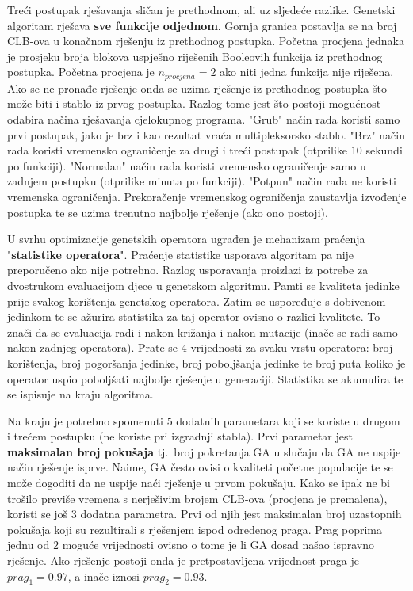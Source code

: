 \documentclass[times, utf8, diplomski]{fer}
\begin{document}
Treći postupak rješavanja sličan je prethodnom, ali uz sljedeće razlike. Genetski algoritam rješava \textbf{sve funkcije odjednom}. Gornja granica postavlja se na broj CLB-ova u konačnom rješenju iz prethodnog postupka. Početna procjena jednaka je prosjeku broja blokova uspješno riješenih Booleovih funkcija iz prethodnog postupka. Početna procjena je $n_{procjena}=2$ ako niti jedna funkcija nije riješena. Ako se ne pronađe rješenje onda se uzima rješenje iz prethodnog postupka što može biti i stablo iz prvog postupka. Razlog tome jest što postoji mogućnost odabira načina rješavanja cjelokupnog programa. "Grub" način rada koristi samo prvi postupak, jako je brz i kao rezultat vraća multipleksorsko stablo. "Brz" način rada koristi vremensko ograničenje za drugi i treći postupak (otprilike $10$ sekundi po funkciji). "Normalan" način rada koristi vremensko ograničenje samo u zadnjem postupku (otprilike minuta po funkciji). "Potpun" način rada ne koristi vremenska ograničenja. Prekoračenje vremenskog ograničenja zaustavlja izvođenje postupka te se uzima trenutno najbolje rješenje (ako ono postoji). 

U svrhu optimizacije genetskih operatora ugrađen je mehanizam praćenja "\textbf{statistike operatora}". Praćenje statistike usporava algoritam pa nije preporučeno ako nije potrebno. Razlog usporavanja proizlazi iz potrebe za dvostrukom evaluacijom djece u genetskom algoritmu. Pamti se kvaliteta jedinke prije svakog korištenja genetskog operatora. Zatim se uspoređuje s dobivenom jedinkom te se ažurira statistika za taj operator ovisno o razlici kvalitete. To znači da se evaluacija radi i nakon križanja i nakon mutacije (inače se radi samo nakon zadnjeg operatora). Prate se $4$ vrijednosti za svaku vrstu operatora: broj korištenja, broj pogoršanja jedinke, broj poboljšanja jedinke te broj puta koliko je operator uspio poboljšati najbolje rješenje u generaciji. Statistika se akumulira te se ispisuje na kraju algoritma.

Na kraju je potrebno spomenuti $5$ dodatnih parametara koji se koriste u drugom i trećem postupku (ne koriste pri izgradnji stabla). Prvi parametar jest \textbf{maksimalan broj pokušaja} tj.~broj pokretanja GA u slučaju da GA ne uspije način rješenje isprve. Naime, GA često ovisi o kvaliteti početne populacije te se može dogoditi da ne uspije naći rješenje u prvom pokušaju. Kako se ipak ne bi trošilo previše vremena s nerješivim brojem CLB-ova (procjena je premalena), koristi se još $3$ dodatna parametra. Prvi od njih jest maksimalan broj uzastopnih pokušaja koji su rezultirali s rješenjem ispod određenog praga. Prag poprima jednu od $2$ moguće vrijednosti ovisno o tome je li GA dosad našao ispravno rješenje. Ako rješenje postoji onda je pretpostavljena vrijednost praga je $prag_{1}=0.97$, a inače iznosi $prag_{2}=0.93$.
\end{document}
